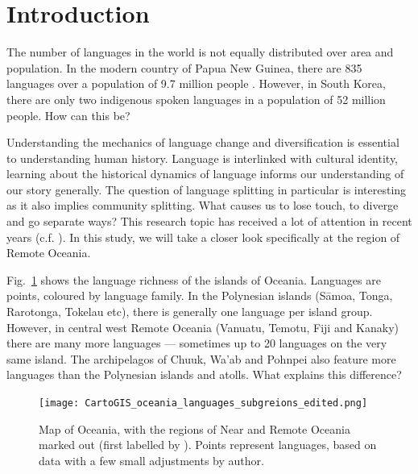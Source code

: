 \documentclass[12pt,letterpaper]{article}
\begin{document}
\newpage
\singlespacing
\tableofcontents

\newpage
\listoffigures
 \listoftables
 \vspace{0.7cm}


\newpage
{}



\newpage
\section{Introduction}
\doublespacing
The number of languages in the world is not equally distributed over area and population. In the modern country of Papua New Guinea, there are 835 languages over a population of 9.7 million people \citep{UN_pop, glottolog4_5}. However, in South Korea, there are only two indigenous spoken languages in a population of 52 million people. How can this be?

Understanding the mechanics of language change and diversification is essential to understanding human history. Language is interlinked with cultural identity, learning about the historical dynamics of language informs our understanding of our story generally. The question of language splitting in particular is interesting as it also implies community splitting. What causes us to lose touch, to diverge and go separate ways? This research topic has received a lot of attention in recent years (c.f. \citet{gavin2017process,  greenhill2015demographic, Pacheco_Coelho_2019, hua2019ecological}). In this study, we will take a closer look specifically at the region of Remote Oceania. 

Fig.~\ref{RO_overnight_coloured_dots} shows the language richness of the islands of Oceania. Languages are points, coloured by language family. In the Polynesian islands (S\={a}moa, Tonga, Rarotonga, Tokelau etc), there is generally one language per island group. However, in central west Remote Oceania (Vanuatu, Temotu, Fiji and Kanaky) there are many more languages --- sometimes up to 20 languages on the very same island. The archipelagos of Chuuk, Wa'ab and Pohnpei also feature more languages than the Polynesian islands and atolls. What explains this difference?

\begin{figure}
\centering
\texttt{[image: CartoGIS\_oceania\_languages\_subgreions\_edited.png]}
\caption{Map of Oceania, with the regions of Near and Remote Oceania marked out (first labelled by \citet{pawley1973dating}). Points represent languages, based on data \citet{glottolog3} with a few small adjustments by author.} 
\label{RO_overnight_coloured_dots}
\end{figure}
\end{document}
